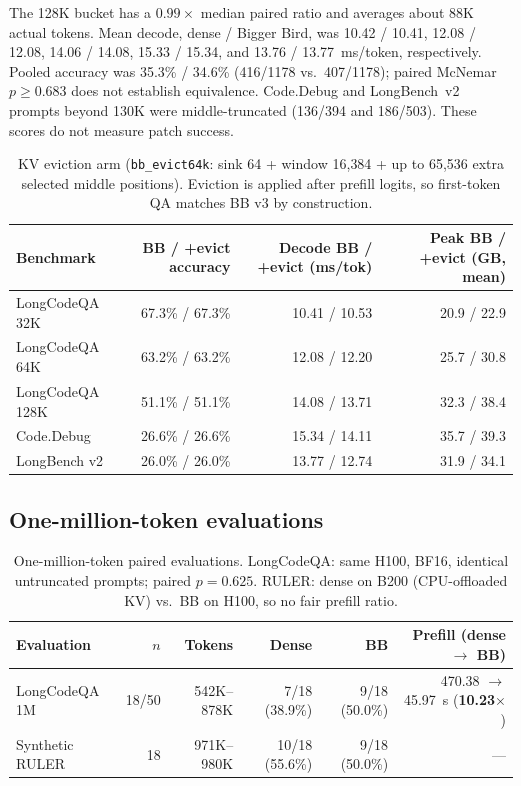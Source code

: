 \documentclass[11pt]{article}
\begin{document}
The 128K bucket has a $0.99\times$ median paired ratio and averages about 88K
actual tokens. Mean decode, dense / Bigger Bird, was 10.42 / 10.41,
12.08 / 12.08, 14.06 / 14.08, 15.33 / 15.34, and 13.76 / 13.77~ms/token,
respectively. Pooled accuracy was 35.3\% / 34.6\% (416/1178 vs.\ 407/1178);
paired McNemar $p \geq 0.683$ does not establish equivalence. Code.Debug and
LongBench~v2 prompts beyond 130K were middle-truncated (136/394 and 186/503).
These scores do not measure patch success.

\begin{table}[ht]
  \centering
  \small
  \caption{KV eviction arm (\texttt{bb\_evict64k}: sink 64 + window 16{,}384 +
  up to 65{,}536 extra selected middle positions). Eviction is applied after
  prefill logits, so first-token QA matches BB v3 by construction.}
  \label{tab:r1-evict}
  \begin{tabular}{@{}lrrr@{}}
    \toprule
    Benchmark & BB / +evict accuracy & Decode BB / +evict (ms/tok) & Peak BB / +evict (GB, mean) \\
    \midrule
    LongCodeQA 32K  & 67.3\% / 67.3\% & 10.41 / 10.53 & 20.9 / 22.9 \\
    LongCodeQA 64K  & 63.2\% / 63.2\% & 12.08 / 12.20 & 25.7 / 30.8 \\
    LongCodeQA 128K & 51.1\% / 51.1\% & 14.08 / 13.71 & 32.3 / 38.4 \\
    Code.Debug      & 26.6\% / 26.6\% & 15.34 / 14.11 & 35.7 / 39.3 \\
    LongBench v2    & 26.0\% / 26.0\% & 13.77 / 12.74 & 31.9 / 34.1 \\
    \bottomrule
  \end{tabular}
\end{table}

\subsection{One-million-token evaluations}

\begin{table}[ht]
  \centering
  \small
  \caption{One-million-token paired evaluations. LongCodeQA: same H100, BF16,
  identical untruncated prompts; paired $p=0.625$. RULER: dense on B200
  (CPU-offloaded KV) vs.\ BB on H100, so no fair prefill ratio.}
  \label{tab:1m-evals}
  \begin{tabular}{@{}lrrrrr@{}}
    \toprule
    Evaluation & $n$ & Tokens & Dense & BB & Prefill (dense $\rightarrow$ BB) \\
    \midrule
    LongCodeQA 1M & 18/50 & 542K--878K & 7/18 (38.9\%) & 9/18 (50.0\%)
      & 470.38 $\rightarrow$ 45.97~s (\textbf{10.23$\times$}) \\
    Synthetic RULER & 18 & 971K--980K & 10/18 (55.6\%) & 9/18 (50.0\%)
      & --- \\
    \bottomrule
  \end{tabular}
\end{table}
\end{document}
